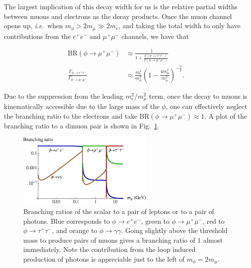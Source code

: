 The largest implication of this decay width for us is the relative partial widths between muons and electrons as the decay products.
Once the muon channel opens up, {\em i.e.}\ when $m_\phi > 2 m_\mu \gg 2 m_e$, and taking the total width to only have contributions from the $e^+ e^-$ and $\mu^+ \mu^-$ channels, we have that

\begin{align}
    \textrm{BR}(\phi \rightarrow \mu^+ \mu^-) &\approx \frac{1}{1+\frac{\Gamma\left(\phi \rightarrow e^+ e^-\right)}{\Gamma\left(\phi \rightarrow \mu^+ \mu^-\right)}} \\
    \frac{\Gamma_{\phi \rightarrow e^+ e^-}}{\Gamma_{\phi \rightarrow \mu^+ \mu^-}} &\approx \frac{m_e^2}{m_\mu^2}\left(1-\frac{4m_\mu^2}{m_\phi^2}\right)^{-\frac{3}{2}}\textrm{.}
\end{align}

\noindent Due to the suppression from the leading $m_e^2/m_\mu^2$ term, once the decay to muons is kinematically accessible due to the large mass of the $\phi$, one can effectively neglect the branching ratio to the electrons and take $\textrm{BR}(\phi \rightarrow \mu^+ \mu^-) \approx 1$.
A plot of the branching ratio to a dimuon pair is shown in Fig.\ \ref{fig:br_phi}.

\begin{figure}[h]
    \centering
    \includegraphics[width = 0.6\textwidth]{Figures/misc/br_phi}
    \caption[Branching ratios of the scalar to a pair of leptons or a pair of photons.]{Branching ratios of the scalar to a pair of leptons or to a pair of photons. Blue corresponds to $\phi \rightarrow e^+ e^-$, green to $\phi \rightarrow \mu^+ \mu^-$, red to $\phi \rightarrow \tau^+ \tau^-$, and orange to $\phi \rightarrow \gamma \gamma$. Going slightly above the threshold mass to produce pairs of muons gives a branching ratio of $1$ almost immediately. Note the contribution from the loop induced production of photons is appreciable just to the left of $m_\phi = 2 m_\mu$.}
    \label{fig:br_phi}
\end{figure}


